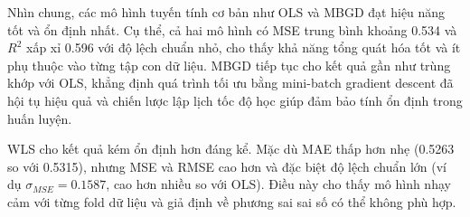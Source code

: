 Nhìn chung, các mô hình tuyến tính cơ bản như OLS và MBGD đạt hiệu năng tốt và
ổn định nhất. Cụ thể, cả hai mô hình có MSE trung bình khoảng 0.534 và $R^2$
xấp xỉ 0.596 với độ lệch chuẩn nhỏ, cho thấy khả năng tổng quát hóa tốt và ít
phụ thuộc vào từng tập con dữ liệu. MBGD tiếp tục cho kết quả gần như trùng
khớp với OLS, khẳng định quá trình tối ưu bằng mini-batch gradient descent đã
hội tụ hiệu quả và chiến lược lập lịch tốc độ học  giúp đảm bảo tính ổn định
trong huấn luyện.

WLS cho kết quả kém ổn định hơn đáng kể. Mặc dù MAE thấp hơn nhẹ (0.5263 so với
0.5315), nhưng MSE và RMSE cao hơn và đặc biệt độ lệch chuẩn lớn (ví dụ
$\sigma_{MSE} = 0.1587$, cao hơn nhiều so với OLS). Điều này cho thấy mô hình
nhạy cảm với từng fold dữ liệu và giả định về phương sai sai số có thể không
phù hợp.
